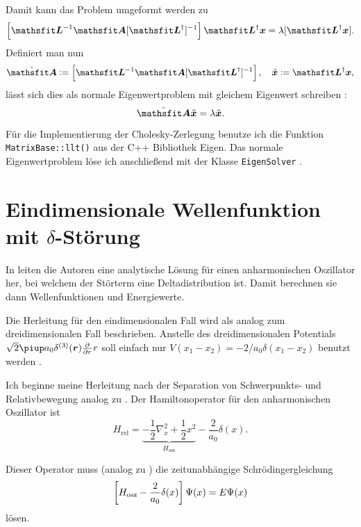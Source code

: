Damit kann das Problem umgeformt werden zu \parencite[(3.31)]{MacKinnon/GEVP}
\[
    \sbr{\tens L^{-1} \tens A [\tens L^\dagger]^{-1}} \tens L^\dagger \vec x
    =
    \lambda [\tens L^\dagger \vec x].
\]
Definiert man nun
\[
    \tilde{\tens A} := \sbr{\tens L^{-1} \tens A [\tens L^\dagger]^{-1}}
    \eqnsep
    \tilde{\vec x} := \tens L^\dagger \vec x,
\]
lässt sich dies als normale Eigenwertproblem mit gleichem Eigenwert schreiben
\parencite[(3.32)]{MacKinnon/GEVP}:
\[
    \tilde{\tens A} \tilde{\vec x} = \lambda \tilde{\vec x}.
\]

Für die Implementierung der Cholesky-Zerlegung benutze ich die Funktion
\texttt{MatrixBase::llt()} \parencite{Eigen/LLT} aus der C++ Bibliothek Eigen.
Das normale Eigenwertproblem löse ich anschließend mit der Klasse
\texttt{EigenSolver} \parencite{Eigen/EigenSolver}.

\section{Eindimensionale Wellenfunktion mit \texorpdfstring{$\delta$}{delta}-Störung}


\newcommand\br[1]{\parencite[(#1)]{Busch/Two_Cold}}

In  leiten die Autoren eine analytische Lösung für
einen anharmonischen Oszillator her, bei welchem der Störterm eine
Deltadistribution ist. Damit berechnen sie dann Wellenfunktionen und
Energiewerte.

Die Herleitung für den eindimensionalen Fall wird als analog zum
dreidimensionalen Fall beschrieben. Anstelle des dreidimensionalen Potentials
$\sqrt 2 \piup a_0 \delta^{(3)}(\vec r) \pd{}r r$ soll einfach nur $V(x_1 -
x_2) = - 2/a_0 \delta(x_1 - x_2)$ benutzt werden
\parencite[Fußnote~20]{Busch/Two_Cold}.

Ich beginne meine Herleitung nach der Separation von Schwerpunkts- und
Relativbewegung analog zu \br2. Der Hamiltonoperator für den anharmonischen
Oszillator ist
\[
    H_\text{rel} = \underbrace{- \frac12 \nabla_x^2 + \frac 12
    x^2}_{H_\text{osz}} - \frac2{a_0} \delta(x).
\]

Dieser Operator muss (analog zu \br3) die zeitunabhängige Schrödingergleichung
\begin{equation}
    \label{eq:Bus_3}
    \sbr{H_\text{osz} - \frac2{a_0} \delta(x)} \Psi(x) = E \Psi(x)
\end{equation}
lösen.

